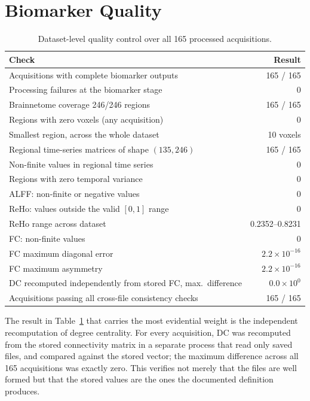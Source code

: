 \documentclass{ssnreview}
\begin{document}
\section{Biomarker Quality}\label{sec:biomarkerqc}

\begin{table}[!htbp]
\centering
\caption{Dataset-level quality control over all 165 processed acquisitions.}
\label{tab:qc}
\small
\begin{tabularx}{\textwidth}{@{}>{\raggedright\arraybackslash}Xr@{}}
\toprule
\textbf{Check} & \textbf{Result} \\
\midrule
Acquisitions with complete biomarker outputs & 165 / 165 \\
Processing failures at the biomarker stage & 0 \\
Brainnetome coverage 246/246 regions & 165 / 165 \\
Regions with zero voxels (any acquisition) & 0 \\
Smallest region, across the whole dataset & 10 voxels \\
Regional time-series matrices of shape $(135,246)$ & 165 / 165 \\
Non-finite values in regional time series & 0 \\
Regions with zero temporal variance & 0 \\
ALFF: non-finite or negative values & 0 \\
ReHo: values outside the valid $[0,1]$ range & 0 \\
ReHo range across dataset & 0.2352--0.8231 \\
FC: non-finite values & 0 \\
FC maximum diagonal error & $2.2\times10^{-16}$ \\
FC maximum asymmetry & $2.2\times10^{-16}$ \\
DC recomputed independently from stored FC, max.\ difference &
$0.0\times10^{0}$ \\
Acquisitions passing all cross-file consistency checks & 165 / 165 \\
\bottomrule
\end{tabularx}
\end{table}

The result in Table~\ref{tab:qc} that carries the most evidential weight is the
independent recomputation of degree centrality. For every acquisition, DC was
recomputed from the stored connectivity matrix in a separate process that read only
saved files, and compared against the stored vector; the maximum difference across
all 165 acquisitions was exactly zero. This verifies not merely that the files are
well formed but that the stored values are the ones the documented definition
produces.
\end{document}
